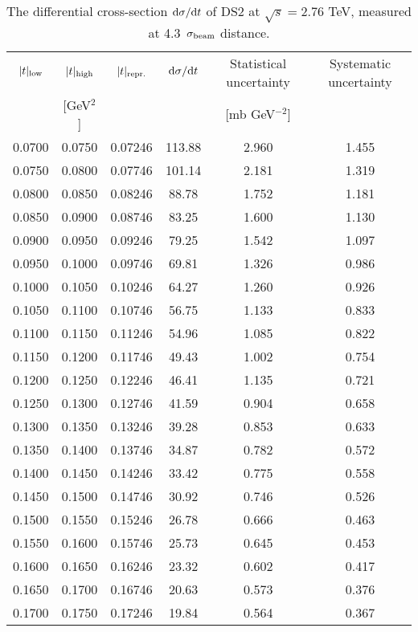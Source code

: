 \documentclass[TOTEM]{cernphprep}
\begin{document}
    \begin{table*}\small\color{black}
        \begin{center}
            \caption{The differential cross-section ${\rm d}\sigma/{\rm d}t$ of DS2 at $\sqrt{s}=$2.76 TeV, measured at 4.3~$\sigma_{\rm beam}$ distance.}
            \begin{tabular}{ | c  c  c | c  c  c|}
		\hline
			$|t|_{\rm low}$		& $|t|_{\rm high}$		&	$|t|_{\rm repr.}$		&	${\rm d}\sigma/{\rm d}t$	& Statistical uncertainty 	&	Systematic uncertainty \\ 
						& [GeV$^{2}$]			&					&					&	[mb GeV$^{-2}$]		& 				\\ \hline 
0.0700	&	0.0750	&	0.07246	&	113.88	&	2.960	&	1.455	\\
0.0750	&	0.0800	&	0.07746	&	101.14	&	2.181	&	1.319	\\
0.0800	&	0.0850	&	0.08246	&	88.78	&	1.752	&	1.181	\\
0.0850	&	0.0900	&	0.08746	&	83.25	&	1.600	&	1.130	\\
0.0900	&	0.0950	&	0.09246	&	79.25	&	1.542	&	1.097	\\
0.0950	&	0.1000	&	0.09746	&	69.81	&	1.326	&	0.986	\\
0.1000	&	0.1050	&	0.10246	&	64.27	&	1.260	&	0.926	\\
0.1050	&	0.1100	&	0.10746	&	56.75	&	1.133	&	0.833	\\
0.1100	&	0.1150	&	0.11246	&	54.96	&	1.085	&	0.822	\\
0.1150	&	0.1200	&	0.11746	&	49.43	&	1.002	&	0.754	\\
0.1200	&	0.1250	&	0.12246	&	46.41	&	1.135	&	0.721	\\
0.1250	&	0.1300	&	0.12746	&	41.59	&	0.904	&	0.658	\\
0.1300	&	0.1350	&	0.13246	&	39.28	&	0.853	&	0.633	\\
0.1350	&	0.1400	&	0.13746	&	34.87	&	0.782	&	0.572	\\
0.1400	&	0.1450	&	0.14246	&	33.42	&	0.775	&	0.558	\\
0.1450	&	0.1500	&	0.14746	&	30.92	&	0.746	&	0.526	\\
0.1500	&	0.1550	&	0.15246	&	26.78	&	0.666	&	0.463	\\
0.1550	&	0.1600	&	0.15746	&	25.73	&	0.645	&	0.453	\\
0.1600	&	0.1650	&	0.16246	&	23.32	&	0.602	&	0.417	\\
0.1650	&	0.1700	&	0.16746	&	20.63	&	0.573	&	0.376	\\
0.1700	&	0.1750	&	0.17246	&	19.84	&	0.564	&	0.367	\\

\end{tabular}
\end{center}
\end{table*}
\end{document}

